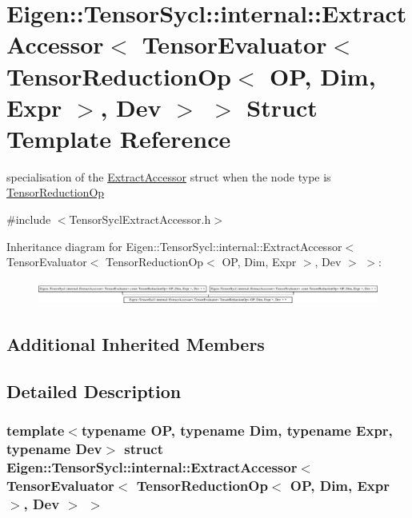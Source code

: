 \hypertarget{struct_eigen_1_1_tensor_sycl_1_1internal_1_1_extract_accessor_3_01_tensor_evaluator_3_01_tensor_2b84b99009c752b26bb930d0598625bb}{}\section{Eigen\+:\+:Tensor\+Sycl\+:\+:internal\+:\+:Extract\+Accessor$<$ Tensor\+Evaluator$<$ Tensor\+Reduction\+Op$<$ OP, Dim, Expr $>$, Dev $>$ $>$ Struct Template Reference}
\label{struct_eigen_1_1_tensor_sycl_1_1internal_1_1_extract_accessor_3_01_tensor_evaluator_3_01_tensor_2b84b99009c752b26bb930d0598625bb}


specialisation of the \hyperlink{struct_eigen_1_1_tensor_sycl_1_1internal_1_1_extract_accessor}{Extract\+Accessor} struct when the node type is \hyperlink{class_eigen_1_1_tensor_reduction_op}{Tensor\+Reduction\+Op}  




{\ttfamily \#include $<$Tensor\+Sycl\+Extract\+Accessor.\+h$>$}

Inheritance diagram for Eigen\+:\+:Tensor\+Sycl\+:\+:internal\+:\+:Extract\+Accessor$<$ Tensor\+Evaluator$<$ Tensor\+Reduction\+Op$<$ OP, Dim, Expr $>$, Dev $>$ $>$\+:\begin{figure}[H]
\begin{center}
\leavevmode
\includegraphics[height=0.804598cm]{struct_eigen_1_1_tensor_sycl_1_1internal_1_1_extract_accessor_3_01_tensor_evaluator_3_01_tensor_2b84b99009c752b26bb930d0598625bb}
\end{center}
\end{figure}
\subsection*{Additional Inherited Members}


\subsection{Detailed Description}
\subsubsection*{template$<$typename OP, typename Dim, typename Expr, typename Dev$>$\newline
struct Eigen\+::\+Tensor\+Sycl\+::internal\+::\+Extract\+Accessor$<$ Tensor\+Evaluator$<$ Tensor\+Reduction\+Op$<$ O\+P, Dim, Expr $>$, Dev $>$ $>$}

